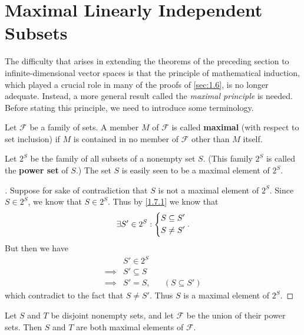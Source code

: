 \section{Maximal Linearly Independent Subsets}\label{sec:1.7}

\begin{note}
  The difficulty that arises in extending the theorems of the preceding section to infinite-dimensional vector spaces is that the principle of mathematical induction, which played a crucial role in many of the proofs of \cref{sec:1.6}, is no longer adequate.
  Instead, a more general result called the \emph{maximal principle} is needed.
  Before stating this principle, we need to introduce some terminology.
\end{note}

\begin{defn}\label{1.7.1}
  Let \(\mathcal{F}\) be a family of sets.
  A member \(M\) of \(\mathcal{F}\) is called \textbf{maximal} (with respect to set inclusion) if \(M\) is contained in no member of \(\mathcal{F}\) other than \(M\) itself.
\end{defn}

\begin{eg}\label{1.7.2}
  Let \(2^S\) be the family of all subsets of a nonempty set \(S\).
  (This family \(2^S\) is called the \textbf{power set} of \(S\).)
  The set \(S\) is easily seen to be a maximal element of \(2^S\).
\end{eg}

\begin{proof}[]
  Suppose for sake of contradiction that \(S\) is not a maximal element of \(2^S\).
  Since \(S \in 2^S\), we know that \(S \in 2^S\).
  Thus by \cref{1.7.1} we know that
  \[
    \exists S' \in 2^S : \begin{dcases}
      S \subseteq S' \\
      S \neq S'
    \end{dcases}.
  \]
  But then we have
  \begin{align*}
             & S' \in 2^S                           \\
    \implies & S' \subseteq S                       \\
    \implies & S' = S,        &  & (S \subseteq S')
  \end{align*}
  which contradict to the fact that \(S \neq S'\).
  Thus \(S\) is a maximal element of \(2^S\).
\end{proof}

\begin{eg}\label{1.7.3}
  Let \(S\) and \(T\) be disjoint nonempty sets, and let \(\mathcal{F}\) be the union of their power sets.
  Then \(S\) and \(T\) are both maximal elements of \(\mathcal{F}\).
\end{eg}

